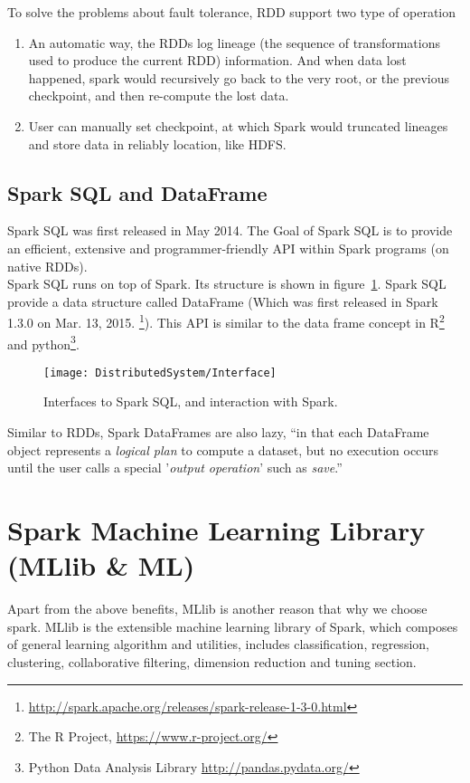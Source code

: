 To solve the problems about fault tolerance, RDD support two type of operation

\begin{enumerate}
	\item An automatic way, the RDDs log lineage (the sequence of transformations used to produce the current RDD) information\cite[Section~2.5]{zaharia2012resilient}. And when data lost happened, spark would recursively go back to the very root, or the previous checkpoint, and then re-compute the lost data.
	\item User can manually set checkpoint, at which Spark would truncated lineages and store data in reliably location, like HDFS\cite[Section~5.3]{zaharia2012resilient}.
\end{enumerate}

\subsection{Spark SQL and DataFrame}
Spark SQL was first released in May 2014. The Goal of Spark SQL is to provide an efficient, extensive and programmer-friendly API within Spark programs (on native RDDs)\cite{armbrust2015spark}.\\ 

Spark SQL runs on top of Spark. Its structure is shown in figure~\ref{fg:spark_structure}. Spark SQL provide a data structure called DataFrame (Which was first released in Spark 1.3.0 on Mar. 13, 2015. \footnote{\url{http://spark.apache.org/releases/spark-release-1-3-0.html}}). This API is similar to the data frame concept in R\footnote{The R Project, \url{https://www.r-project.org/}} and python\footnote{Python Data Analysis Library \url{http://pandas.pydata.org/}}.\\

\begin{figure}[h]
	\centering
	\texttt{[image: DistributedSystem/Interface]}
	\caption{Interfaces to Spark SQL, and interaction with Spark\cite{armbrust2015spark}.}
	\label{fg:spark_structure}
\end{figure}


Similar to RDDs, Spark DataFrames are also lazy, ``in that each DataFrame object represents a \textit{logical plan} to compute a dataset, but no execution occurs until the user calls a special '\textit{output operation}' such as \textit{save}.''\cite{armbrust2015spark}


\section{Spark Machine Learning Library (MLlib \& ML)}
Apart from the above benefits, MLlib is another reason that why we choose spark. MLlib is the extensible machine learning  library of Spark, which composes of general learning algorithm and utilities, includes classification, regression, clustering, collaborative filtering, dimension reduction and tuning section\cite{meng2016mllib}.\\


